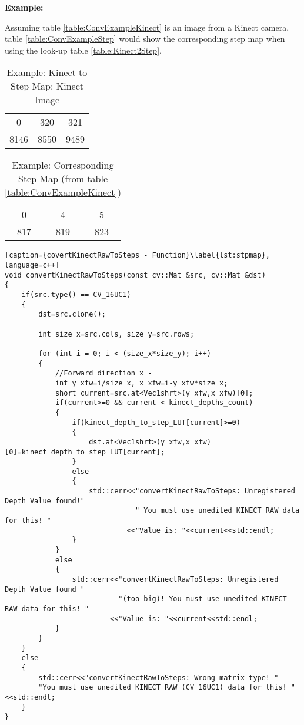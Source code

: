 \textbf{Example:}

Assuming table \vref{table:ConvExampleKinect} is an image from a Kinect camera, 
table \vref{table:ConvExampleStep} would show the corresponding step map when using the look-up table \vref{table:Kinect2Step}.

\begin{table}[H]
\centering
\huge
\begin{tabular}{ccc}
0 & 320 & 321\\
8146 & 8550 & 9489\\
\end{tabular}
\caption{Example: Kinect to Step Map: Kinect Image}
\label{table:ConvExampleKinect}
\end{table}

\begin{table}[H]
\centering
\huge
\begin{tabular}{ccc}
0 & 4 & 5\\
817 & 819 & 823\\
\end{tabular}
\caption[Example: Corresponding Step Map]{Example: Corresponding Step Map (from table \vref{table:ConvExampleKinect})}
\label{table:ConvExampleStep}
\end{table}

\begin{lstlisting}[caption={covertKinectRawToSteps - Function}\label{lst:stpmap}, language=c++]
void convertKinectRawToSteps(const cv::Mat &src, cv::Mat &dst)
{
	if(src.type() == CV_16UC1)
	{
		dst=src.clone();

		int size_x=src.cols, size_y=src.rows;

		for (int i = 0; i < (size_x*size_y); i++)
		{
			//Forward direction x -
			int y_xfw=i/size_x, x_xfw=i-y_xfw*size_x;
			short current=src.at<Vec1shrt>(y_xfw,x_xfw)[0];
			if(current>=0 && current < kinect_depths_count)
			{
				if(kinect_depth_to_step_LUT[current]>=0)
				{
					dst.at<Vec1shrt>(y_xfw,x_xfw)[0]=kinect_depth_to_step_LUT[current];
				}
				else
				{
					std::cerr<<"convertKinectRawToSteps: Unregistered Depth Value found!" 
					           " You must use unedited KINECT RAW data for this! "
							 <<"Value is: "<<current<<std::endl;
				}
			}
			else
			{
				std::cerr<<"convertKinectRawToSteps: Unregistered Depth Value found " 
				           "(too big)! You must use unedited KINECT RAW data for this! "
						 <<"Value is: "<<current<<std::endl;
			}
		}
	}
	else
	{
		std::cerr<<"convertKinectRawToSteps: Wrong matrix type! "
		"You must use unedited KINECT RAW (CV_16UC1) data for this! "<<std::endl;
	}
}
\end{lstlisting}


